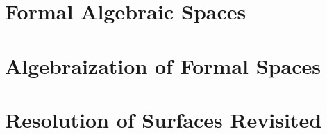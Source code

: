 \chapter{Formal Algebraic Spaces}
\label{chap:formal-spaces}


\chapter{Algebraization of Formal Spaces}
\label{chap:restricted}


\chapter{Resolution of Surfaces Revisited}
\label{chap:spaces-resolve}

